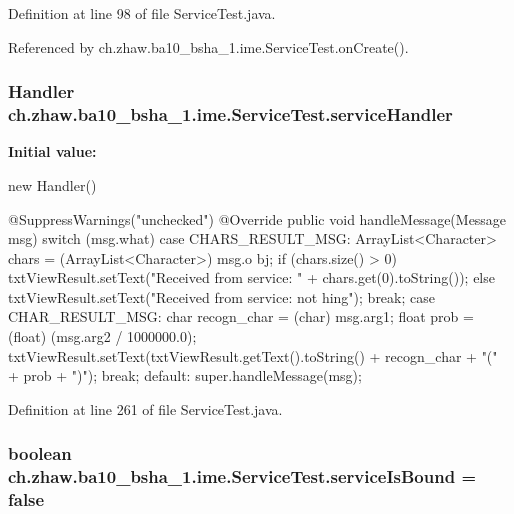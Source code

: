 Definition at line 98 of file ServiceTest.java.

Referenced by ch.zhaw.ba10\_\-bsha\_\-1.ime.ServiceTest.onCreate().\hypertarget{classch_1_1zhaw_1_1ba10__bsha__1_1_1ime_1_1ServiceTest_a396e691506a0c43959988e291d8281c3}{
\subsubsection[{serviceHandler}]{\setlength{\rightskip}{0pt plus 5cm}Handler {\bf ch.zhaw.ba10\_\-bsha\_\-1.ime.ServiceTest.serviceHandler}}}
\label{classch_1_1zhaw_1_1ba10__bsha__1_1_1ime_1_1ServiceTest_a396e691506a0c43959988e291d8281c3}
{\bfseries Initial value:}
\begin{DoxyCode}
 new Handler() {
        
        @SuppressWarnings("unchecked")
                @Override
                public void handleMessage(Message msg) {
            switch (msg.what) {
                case CHARS_RESULT_MSG:
                        ArrayList<Character> chars = (ArrayList<Character>) msg.o
      bj;
                        if (chars.size() > 0) {
                                txtViewResult.setText("Received from service: " +
       chars.get(0).toString());
                        } else {
                                txtViewResult.setText("Received from service: not
      hing");
                        }
                    break;
                case CHAR_RESULT_MSG:
                        char recogn_char = (char) msg.arg1;
                        float prob = (float) (msg.arg2 / 1000000.0);
                        txtViewResult.setText(txtViewResult.getText().toString() 
      + recogn_char + "(" + prob + ")");
                    break;
                default:
                    super.handleMessage(msg);
            }
        }
        
    }
\end{DoxyCode}


Definition at line 261 of file ServiceTest.java.\hypertarget{classch_1_1zhaw_1_1ba10__bsha__1_1_1ime_1_1ServiceTest_a1be1618594a88e74deea51ba0c351fd5}{
\subsubsection[{serviceIsBound}]{\setlength{\rightskip}{0pt plus 5cm}boolean {\bf ch.zhaw.ba10\_\-bsha\_\-1.ime.ServiceTest.serviceIsBound} = false}}
\label{classch_1_1zhaw_1_1ba10__bsha__1_1_1ime_1_1ServiceTest_a1be1618594a88e74deea51ba0c351fd5}


